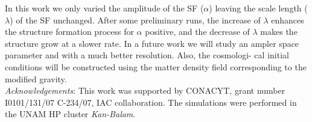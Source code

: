 \documentclass[10pt,twocolumn]{article}
\begin{document}
In this work we only varied the amplitude of the SF ($ \alpha$) leaving the scale length ($\lambda$) of the SF unchanged.
After some preliminary runs, the increase of $\lambda$ enhances the structure formation process for $\alpha$ positive, and the decrease of $\lambda$ makes the structure grow at a slower rate.
In a future work we will study an ampler space parameter and with a much better resolution. Also, the cosmologi- cal initial conditions will be constructed using the matter density ﬁeld corresponding to the modiﬁed gravity.
\\
\textit{Acknowledgements}: This work was supported by CONACYT, grant number I0101/131/07 C-234/07, IAC collaboration. The simulations were performed in the UNAM HP cluster \textit{Kan-Balam}.
\renewcommand{\refname}{}


\end{document}
